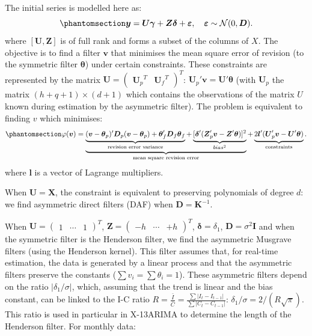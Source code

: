 \documentclass[
]{article}
\newcommand\transp[1]{{#1}^T}
\newcommand\1{\mathds{1}}
\begin{document}
The initial series is modelled here as:
\begin{equation}\phantomsection\label{eq-lpgeneralmodel}{
\boldsymbol y=\boldsymbol U \boldsymbol \gamma+\boldsymbol Z\boldsymbol \delta+\boldsymbol \varepsilon,\quad
\boldsymbol \varepsilon\sim\mathcal{N}(0,\boldsymbol D).
}\end{equation} where \([\boldsymbol U,\boldsymbol Z]\) is of full rank
and forms a subset of the columns of \(X\). The objective is to find a
filter \(\boldsymbol v\) that minimises the mean square error of
revision (to the symmetric filter \(\boldsymbol \theta\)) under certain
constraints. These constraints are represented by the matrix
\(\boldsymbol U=\transp{\begin{pmatrix} \transp{\boldsymbol U_{p}}& \transp{\boldsymbol U_{f}}\end{pmatrix}}\):
\(\boldsymbol U_p'\boldsymbol v=\boldsymbol U'\boldsymbol \theta\) (with
\(\boldsymbol U_p\) the matrix \((h+q+1)\times (d+1)\) which contains
the observations of the matrix \(U\) known during estimation by the
asymmetric filter). The problem is equivalent to finding \(v\) which
minimises: \begin{equation}\phantomsection\label{eq-lppasym}{
\varphi(\boldsymbol v)=
\underbrace{
  \underbrace{(\boldsymbol v-\boldsymbol \theta_{p})'\boldsymbol D_{p}(\boldsymbol v-\boldsymbol \theta_{p})+
  \boldsymbol \theta_{f}'\boldsymbol D_{f}\boldsymbol \theta_{f}}_\text{revision error variance}+
  \underbrace{[\boldsymbol \delta'(\boldsymbol Z_{p}'\boldsymbol v-\boldsymbol Z'\boldsymbol \theta)]^{2}}_{bias^2}
}_\text{mean square revision error}+
\underbrace{2\boldsymbol l'(\boldsymbol U_{p}'\boldsymbol v-\boldsymbol U'\boldsymbol \theta)}_{\text{constraints}}.
}\end{equation} where \(\boldsymbol l\) is a vector of Lagrange
multipliers.

When \(\boldsymbol U=\boldsymbol X\), the constraint is equivalent to
preserving polynomials of degree \(d\): we find asymmetric direct
filters (DAF) when \(\boldsymbol D=\boldsymbol K^{-1}\).

When \(\boldsymbol U=\transp{\begin{pmatrix}1&\cdots&1\end{pmatrix}}\),
\(\boldsymbol Z=\transp{\begin{pmatrix}-h&\cdots&+h\end{pmatrix}}\),
\(\boldsymbol \delta=\delta_1\), \(\boldsymbol D=\sigma^2\boldsymbol I\)
and when the symmetric filter is the Henderson filter, we find the
asymmetric Musgrave filters (using the Henderson kernel). This filter
assumes that, for real-time estimation, the data is generated by a
linear process and that the asymmetric filters preserve the constants
(\(\sum v_i=\sum \theta_i=1\)). These asymmetric filters depend on the
ratio \(\lvert\delta_1/\sigma\rvert\), which, assuming that the trend is
linear and the bias constant, can be linked to the I-C ratio
\(R=\frac{\bar{I}}{\bar{C}}=\frac{\sum\lvert I_t-I_{t-1}\rvert}{\sum\lvert C_t-C_{t-1}\rvert}\):
\(\delta_1/\sigma=2/(R\sqrt{\pi})\). This ratio is used in particular in
X-13ARIMA to determine the length of the Henderson filter. For monthly
data:
\end{document}
